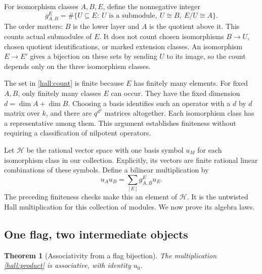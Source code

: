\documentclass[11pt]{article}
\newtheorem{theorem}{Theorem}[section]
\theoremstyle{definition}
\theoremstyle{remark}\newtheorem{remark}[theorem]{Remark}
\newcommand{\kk}{k}
\begin{document}
For isomorphism classes $A,B,E$, define the nonnegative integer
\begin{equation}\label{hall:count}
g_{A,B}^{E}
=\#\{U\subseteq E:\ U\text{ is a submodule},\ U\cong B,\ E/U\cong A\}.
\end{equation}
The order matters: $B$ is the lower layer and $A$ is the quotient above it.
This counts actual submodules of $E$. It does not count chosen
isomorphisms $B\to U$, chosen quotient identifications, or marked
extension classes. An isomorphism $E\to E'$ gives a bijection on these
sets by sending $U$ to its image, so the count depends only on the three
isomorphism classes.

The set in \eqref{hall:count} is finite because $E$ has finitely many
elements. For fixed $A,B$, only finitely many classes $E$ can occur.
They have the fixed dimension $d=\dim A+\dim B$. Choosing a basis
identifies such an operator with a $d$ by $d$ matrix over $\kk$, and
there are $q^{d^2}$ matrices altogether. Each isomorphism class has a
representative among them. This argument establishes finiteness without
requiring a classification of nilpotent operators.

Let $\mathcal H$ be the rational vector space with one basis symbol
$u_M$ for each isomorphism class in our collection. Explicitly, its
vectors are finite rational linear combinations of these symbols.
Define a bilinear multiplication by
\begin{equation}\label{hall:product}
u_Au_B=\sum_{[E]}g_{A,B}^{E}u_E.
\end{equation}
The preceding finiteness checks make this an element of $\mathcal H$.
It is the untwisted Hall multiplication for this collection of modules.
We now prove its algebra laws.

\subsection{One flag, two intermediate objects}

\begin{theorem}[Associativity from a flag bijection]\label{hall:associativity}
The multiplication \eqref{hall:product} is associative, with identity $u_0$.
\end{theorem}
\end{document}
